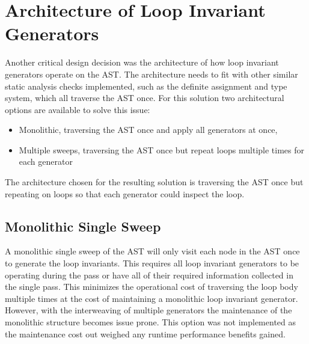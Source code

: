 \section{Architecture of Loop Invariant Generators}

Another critical design decision was the architecture of how loop invariant
generators operate on the AST.
The architecture needs to fit with other similar static analysis checks
implemented, such as the definite assignment and type system, which all
traverse the AST once.
For this solution two architectural options are available to solve this issue:

\begin{itemize}
	\item{Monolithic, traversing the AST once and apply all generators at once,}
	\item{Multiple sweeps, traversing the AST once but repeat loops multiple times for each generator}
\end{itemize}

The architecture chosen for the resulting solution is  traversing the AST once
but repeating on loops so that each generator could inspect the loop.

\subsection{Monolithic Single Sweep}

A monolithic single sweep of the AST will only visit each
node in the AST once to generate the loop invariants.
This requires all loop invariant generators to be operating
during the pass or have all of their required information collected
in the single pass.
This minimizes the operational cost of traversing the loop body
multiple times at the cost of maintaining a monolithic loop invariant generator.
However, with the interweaving of multiple generators the maintenance of the
monolithic structure becomes issue prone.
This option was not implemented as the maintenance cost out weighed any
runtime performance benefits gained.


